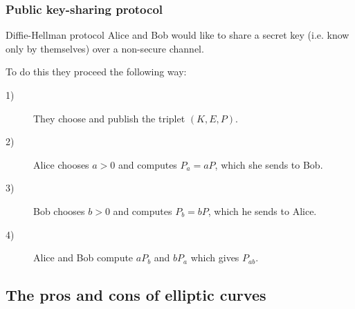 \begin{frame}[t]
    \frametitle{Public key-sharing protocol}
    \begin{exampleblock}{Diffie-Hellman protocol}
        Alice and Bob would like to share a secret key (i.e. know only by themselves) over a non-secure channel.

        To do this they proceed the following way:
        \begin{description}
            \item[1)] 
                They choose and publish the triplet $\left( K,E,P \right) $.

            \item[2)] Alice chooses $a>0$ and computes $P_{a} =
                aP$, which she sends to Bob.

            \item[3)] Bob chooses $b>0$ and computes $P_{b} =
                bP$, which he sends to Alice.
                \item[4)] Alice and Bob compute $aP_{b}$ and $bP_{a}$ which gives $P_{ab}$.
        \end{description}
    \end{exampleblock}
\end{frame}

\subsection{The pros and cons of elliptic curves}

